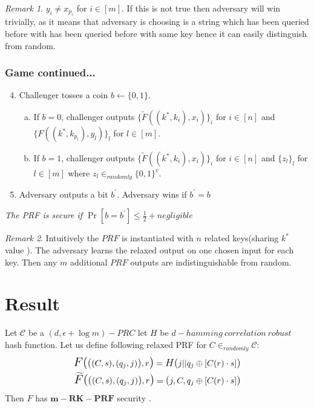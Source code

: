 \documentclass[hyperref={pdfpagelabels=false}]{beamer}
\theoremstyle{remark}
\newtheorem*{remark}{Remark}
\begin{document}
\begin{frame}

\begin{remark}
$y_i \neq x_{p_i}$ for $i \in \left[m\right]$. If this is not true then adversary will win trivially, as it means that adversary is choosing is a string which has been queried before with has been queried before with same key hence it can easily distinguish from random.
\end{remark}
\end{frame}
\begin{frame}
\frametitle{Game continued...}
\begin{enumerate}
\setcounter{enumi}{3}
\item Challenger tosses a coin $b \leftarrow \{0,1\}$.\pause
\begin{enumerate}[(a)]
\item If $b=0$, challenger outputs $\{\widetilde{F}((k^*,k_i),x_i)\}_i$ for $i \in \left[n\right]$ and $\{F((k^*,k_{p_l}),y_l)\}_l$ for $l \in \left[m\right]$.\pause
\item If $b=1$, challenger outputs $\{\widetilde{F}((k^*,k_i),x_i)\}_i$ for $i \in \left[n\right]$ and $\{z_l\}_l$ for $l \in \left[m\right]$ where $z_l \in_{randomly} \{0,1\}^v$.\pause
\end{enumerate}
\item Adversary outputs a bit $b^\prime$. Adversary wins if $b^\prime = b$\pause
\end{enumerate}
\textit{The PRF is secure if $\Pr\left[b=b^\prime\right] \leq \frac{1}{2} + negligible$} \pause
\begin{remark}
Intuitively the $PRF$ is instantiated with $n$ related keys(sharing $k^*$ value ). The adversary learns the relaxed output on one chosen input for each key. Then any $m$ additional $PRF$ outputs are indistinguishable from random.
\end{remark}
\end{frame}

\section{Result}
\begin{lemma}[2]
Let $\mathcal{C}$ be a $(d,\epsilon+\log{m})-PRC$ let  $H$ be $d-hamming\ correlation\ robust$ hash function. Let us define following relaxed PRF for $C \in_{randomly} \mathcal{C}:$
\begin{align*}
\mathlarger{\mathlarger{F(}} \mathlarger{(}  (C,s),(q_j,j)\mathlarger{)}, r \mathlarger{\mathlarger{)}} = \mathlarger{H(} j||q_j \oplus [C(r)\cdot s] \mathlarger{)}
\\
\mathlarger{\mathlarger{\widetilde{F}(}} \mathlarger{(}  (C,s),(q_j,j)\mathlarger{)}, r \mathlarger{\mathlarger{)}} = \mathlarger{(} j, C, q_j \oplus [C(r)\cdot s] \mathlarger{)}
\end{align*}
Then $F$ has $\mathbf{m-RK-PRF}$ security .
\end{lemma}
\end{document}
